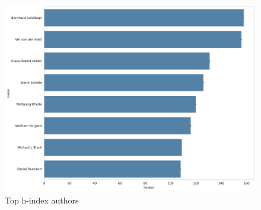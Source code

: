 \begin{figure}
    \centering
    \includegraphics[width=0.8\linewidth]{figures/h-index-top.pdf}
    \caption{Top h-index authors}
    \label{fig:h-index-top}
\end{figure}